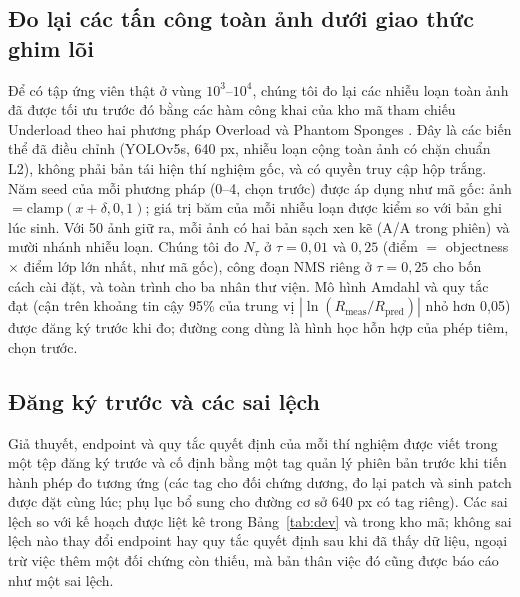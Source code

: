 \documentclass[a4paper,fleqn]{cas-dc}
\newcommand{\Ntau}{N_{\tau}}
\begin{document}
\subsection{Đo lại các tấn công toàn ảnh dưới giao thức ghim lõi}
\label{sec:attackdesign}
Để có tập ứng viên thật ở vùng $10^3$--$10^4$, chúng tôi đo lại các nhiễu loạn toàn ảnh đã được tối ưu trước đó bằng các hàm công khai của kho mã tham chiếu Underload \cite{underload2025} theo hai phương pháp Overload \cite{overload2024} và Phantom Sponges \cite{phantom2023}. Đây là các biến thể đã điều chỉnh (YOLOv5s, 640 px, nhiễu loạn cộng toàn ảnh có chặn chuẩn L2), không phải bản tái hiện thí nghiệm gốc, và có quyền truy cập hộp trắng. Năm seed của mỗi phương pháp (0--4, chọn trước) được áp dụng như mã gốc: ảnh $=\mathrm{clamp}(x+\delta,0,1)$; giá trị băm của mỗi nhiễu loạn được kiểm so với bản ghi lúc sinh. Với 50 ảnh giữ ra, mỗi ảnh có hai bản sạch xen kẽ (A/A trong phiên) và mười nhánh nhiễu loạn. Chúng tôi đo $\Ntau$ ở $\tau=0{,}01$ và $0{,}25$ (điểm $=$ objectness $\times$ điểm lớp lớn nhất, như mã gốc), công đoạn NMS riêng ở $\tau=0{,}25$ cho bốn cách cài đặt, và toàn trình cho ba nhân thư viện. Mô hình Amdahl và quy tắc đạt (cận trên khoảng tin cậy 95\% của trung vị $|\ln(R_{\mathrm{meas}}/R_{\mathrm{pred}})|$ nhỏ hơn 0,05) được đăng ký trước khi đo; đường cong dùng là hình học hỗn hợp của phép tiêm, chọn trước.

\subsection{Đăng ký trước và các sai lệch}
Giả thuyết, endpoint và quy tắc quyết định của mỗi thí nghiệm được viết trong một tệp đăng ký trước và cố định bằng một tag quản lý phiên bản trước khi tiến hành phép đo tương ứng (các tag cho đối chứng dương, đo lại patch và sinh patch được đặt cùng lúc; phụ lục bổ sung cho đường cơ sở 640 px có tag riêng). Các sai lệch so với kế hoạch được liệt kê trong Bảng~\ref{tab:dev} và trong kho mã; không sai lệch nào thay đổi endpoint hay quy tắc quyết định sau khi đã thấy dữ liệu, ngoại trừ việc thêm một đối chứng còn thiếu, mà bản thân việc đó cũng được báo cáo như một sai lệch.
\end{document}
